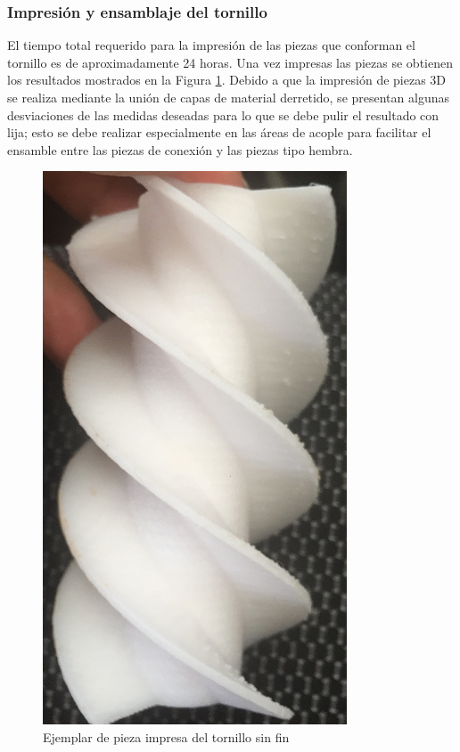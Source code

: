 \subsubsection{Impresión y ensamblaje del tornillo}

El tiempo total requerido para la impresión de las piezas que conforman el tornillo es de aproximadamente 24 horas. Una vez impresas las piezas se obtienen los resultados mostrados en la Figura \ref{piezatornipng}. Debido a que la impresión de piezas 3D se realiza mediante la unión de capas de material derretido, se presentan algunas desviaciones de las medidas deseadas para lo que se debe pulir el resultado con lija; esto se debe realizar especialmente en las áreas de acople para facilitar el ensamble entre las piezas de conexión y las piezas tipo hembra.

    \begin{figure}[H]
        \centering
        \includegraphics[scale=0.7, angle=90]{img/piezatorni2.png}
        \caption{Ejemplar de pieza impresa del tornillo sin fin} \label{piezatornipng}
    \end{figure}

